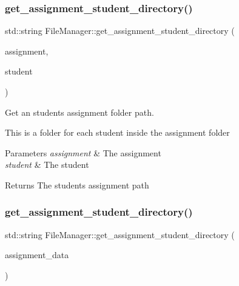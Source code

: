 \subsubsection{\texorpdfstring{get\+\_\+assignment\+\_\+student\+\_\+directory()}{get\_assignment\_student\_directory()}\hspace{0.1cm}{\footnotesize\ttfamily [1/2]}}
{\footnotesize\ttfamily std\+::string File\+Manager\+::get\+\_\+assignment\+\_\+student\+\_\+directory (\begin{DoxyParamCaption}\item[{\hyperlink{class_g_a_assignment}{G\+A\+Assignment} $\ast$}]{assignment,  }\item[{\hyperlink{class_g_a_student}{G\+A\+Student} $\ast$}]{student }\end{DoxyParamCaption})\hspace{0.3cm}{\ttfamily [static]}}



Get an student\textquotesingle{}s assignment folder path. 

This is a folder for each student inside the assignment folder


\begin{DoxyParams}{Parameters}
{\em assignment} & The assignment \\
\hline
{\em student} & The student \\
\hline
\end{DoxyParams}
\begin{DoxyReturn}{Returns}
The student\textquotesingle{}s assignment path 
\end{DoxyReturn}
\mbox{\label{class_file_manager_abd8c26063a5740fc447fbc8086caef9f}} 
\subsubsection{\texorpdfstring{get\+\_\+assignment\+\_\+student\+\_\+directory()}{get\_assignment\_student\_directory()}\hspace{0.1cm}{\footnotesize\ttfamily [2/2]}}
{\footnotesize\ttfamily std\+::string File\+Manager\+::get\+\_\+assignment\+\_\+student\+\_\+directory (\begin{DoxyParamCaption}\item[{\hyperlink{class_g_a_assignment_data}{G\+A\+Assignment\+Data} $\ast$}]{assignment\+\_\+data }\end{DoxyParamCaption})\hspace{0.3cm}{\ttfamily [static]}}



